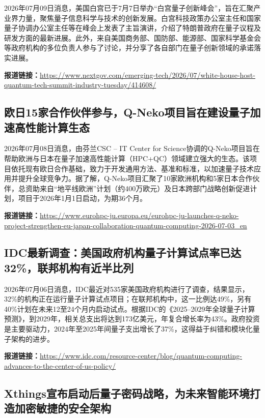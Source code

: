 \documentclass[12pt,a4paper]{ctexart}
\begin{document}
2026年07月09日消息，美国白宫已于7月7日举办“白宫量子创新峰会”，旨在汇聚产业界力量，聚焦量子信息科学与技术的创新发展。白宫科技政策办公室主任和国家量子协调办公室主任等在峰会上发表了主旨演讲，介绍了特朗普政府在量子议程及研发方面的最新进展。此外，来自美国商务部、国防部、能源部、国家科学基金会等政府机构的多位负责人参与了讨论，并分享了各自部门在量子创新领域的承诺落实进展。

\noindent\textbf{报道链接：}\url{https://www.nextgov.com/emerging-tech/2026/07/white-house-host-quantum-tech-summit-industry-tuesday/414608/}

\subsection{ 欧日15家合作伙伴参与，Q-Neko项目旨在建设量子加速高性能计算生态 }

2026年07月08日消息，由芬兰CSC – IT Center for Science协调的Q-Neko项目旨在帮助欧洲与日本在量子加速高性能计算（HPC+QC）领域建立强大的生态。该项目依托现有欧日合作基础，致力于开发通用方法、基准和标准，以加速量子技术应用并提升全球竞争力。据了解，Q-Neko项目汇聚了10家欧洲机构和5家日本合作伙伴，总资助来自“地平线欧洲”计划（约400万欧元）及日本跨部门战略创新促进计划，项目于2026年1月1日启动，为期36个月。

\noindent\textbf{报道链接：}\url{https://www.eurohpc-ju.europa.eu/eurohpc-ju-launches-q-neko-project-strengthen-eu-japan-collaboration-quantum-computing-2026-07-03\_en}

\subsection{ IDC最新调查：美国政府机构量子计算试点率已达32\%，联邦机构有近半比列 }

2026年07月06日消息，IDC最近对535家美国政府机构进行了调查，结果显示，32\%的机构正在运行量子计算试点项目；在联邦机构中，这一比例达49\%，另有40\%计划在未来12至24个月内启动试点。根据IDC的《2025–2029年全球量子计算预测》，到2029年，相关总支出将达到173亿美元，年复合增长率为43\%。政府投资是主要驱动力，2024年至2025年间量子支出增长了37\%，这得益于纠错和模块化量子架构的进步。

\noindent\textbf{报道链接：}\url{https://www.idc.com/resource-center/blog/quantum-computing-advances-to-the-center-of-us-policy/}

\subsection{ Xthings宣布启动后量子密码战略，为未来智能环境打造加密敏捷的安全架构 }
\end{document}

